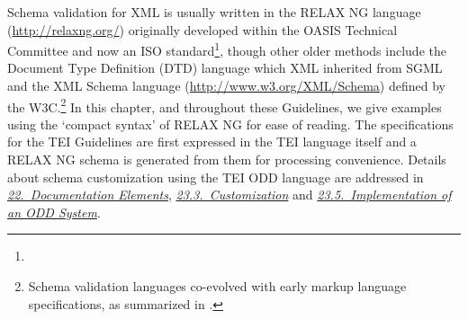 Schema validation for XML is usually written in the RELAX NG language (\url{http://relaxng.org/}) originally developed within the OASIS Technical Committee and now an ISO standard\footnote{}, though other older methods include the Document Type Definition (DTD) language which XML inherited from SGML and the XML Schema language (\url{http://www.w3.org/XML/Schema}) defined by the W3C.\footnote{Schema validation languages co-evolved with early markup language specifications, as summarized in .} In this chapter, and throughout these Guidelines, we give examples using the ‘compact syntax’ of RELAX NG for ease of reading. The specifications for the TEI Guidelines are first expressed in the TEI language itself and a RELAX NG schema is generated from them for processing convenience. Details about schema customization using the TEI ODD language are addressed in \textit{\hyperref[TD]{22.\ Documentation Elements}}, \textit{\hyperref[MD]{23.3.\ Customization}} and \textit{\hyperref[IM]{23.5.\ Implementation of an ODD System}}.
